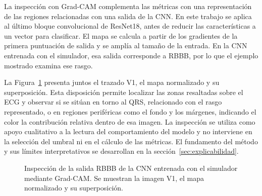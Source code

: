 La inspección con Grad-CAM complementa las métricas con una representación de las regiones relacionadas con una salida de la CNN. En este trabajo se aplica al último bloque convolucional de ResNet18, antes de reducir las características a un vector para clasificar. El mapa se calcula a partir de los gradientes de la primera puntuación de salida y se amplía al tamaño de la entrada. En la CNN entrenada con el simulador, esa salida corresponde a RBBB, por lo que el ejemplo mostrado examina ese rasgo.

\begin{samepage}
La Figura~\ref{fig:gradcam_sintetico_modelos} presenta juntos el trazado V1, el mapa normalizado y su superposición. Esta disposición permite localizar las zonas resaltadas sobre el ECG y observar si se sitúan en torno al QRS, relacionado con el rasgo representado, o en regiones periféricas como el fondo y los márgenes, indicando el color la contribución relativa dentro de esa imagen. La inspección se utiliza como apoyo cualitativo a la lectura del comportamiento del modelo y no interviene en la selección del umbral ni en el cálculo de las métricas. El fundamento del método y sus límites interpretativos se desarrollan en la sección~\ref{sec:explicabilidad}.
\par
\end{samepage}

\begin{figure}[H]
  \centering
  \caption{Inspección de la salida RBBB de la CNN entrenada con el simulador mediante Grad-CAM. Se muestran la imagen V1, el mapa normalizado y su superposición.}
  \label{fig:gradcam_sintetico_modelos}
\end{figure}
